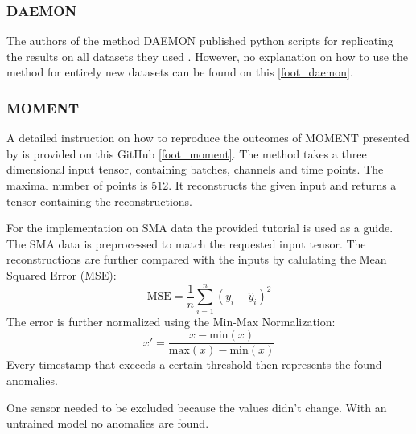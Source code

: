 \subsubsection{DAEMON}
The authors of the method DAEMON published python scripts for replicating the results on all datasets they used \cite{chen_adversarial_2023}. However, no explanation on how to use the method for entirely new datasets can be found on this \autoref{foot_daemon}.

\subsubsection{MOMENT}
A detailed instruction on how to reproduce the outcomes of MOMENT presented by \cite{goswami_moment_2024} is provided on this GitHub \autoref{foot_moment}. The method takes a three dimensional input tensor, containing batches, channels and time points. The maximal number of points is 512. It reconstructs the given input and returns a tensor containing the reconstructions.

For the implementation on SMA data the provided tutorial is used as a guide. The SMA data is preprocessed to match the requested input tensor. The reconstructions are further compared with the inputs by calulating the Mean Squared Error (MSE):
\begin{equation}
    \text{MSE} = \frac{1}{n} \sum_{i=1}^{n} \left( y_i - \hat{y}_i \right)^2
\end{equation}
The error is further normalized using the Min-Max Normalization:
\begin{equation}
x' = \frac{x - \text{min}(x)}{\text{max}(x) - \text{min}(x)}
\end{equation}
Every timestamp that exceeds a certain threshold then represents the found anomalies.

One sensor needed to be excluded because the values didn't change.
With an untrained model no anomalies are found.
